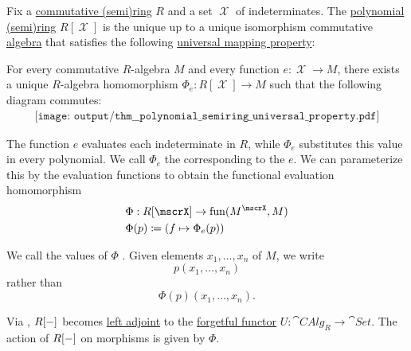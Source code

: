\begin{proposition}\label{thm:polynomial_semiring_universal_property}
  Fix a \hyperref[def:semiring/commutative]{commutative (semi)ring} \( R \) and a set \( \mscrX \) of indeterminates. The \hyperref[def:polynomial_semiring]{polynomial (semi)ring} \( R[\mscrX] \) is the unique up to a unique isomorphism commutative \hyperref[def:algebra_over_semiring]{algebra} that satisfies the following \hyperref[rem:universal_mapping_property]{universal mapping property}:
  \begin{displayquote}
    For every commutative \( R \)-algebra \( M \) and every function \( e: \mscrX \to M \), there exists a unique \( R \)-algebra homomorphism \( \Phi_e: R[\mscrX] \to M \) such that the following diagram commutes:
    \begin{equation}\label{eq:thm:free_semimodule_universal_property/diagram}
      \begin{aligned}
        \texttt{[image: output/thm\_\_polynomial\_semiring\_universal\_property.pdf]}
      \end{aligned}
    \end{equation}
  \end{displayquote}

  The function \( e \) evaluates each indeterminate in \( R \), while \( \Phi_e \) substitutes this value in every polynomial. We call \( \Phi_e \) the  corresponding to the  \( e \). We can parameterize this by the evaluation functions to obtain the functional evaluation homomorphism
  \begin{equation*}
    \begin{aligned}
      &\Phi: R[\mscrX] \to \fun(M^\mscrX, M) \\
      &\Phi(p) \coloneqq (f \mapsto \Phi_e(p))
    \end{aligned}
  \end{equation*}

  We call the values of \( \Phi \) . Given elements \( x_1, \ldots, x_n \) of \( M \), we write
  \begin{equation*}
    p(x_1, \ldots, x_n)
  \end{equation*}
  rather than
  \begin{equation*}
    \Phi(p)(x_1, \ldots, x_n).
  \end{equation*}

  Via , \( R[\anon*] \) becomes \hyperref[def:category_adjunction]{left adjoint} to the \hyperref[def:concrete_category]{forgetful functor} \( U: \cat{CAlg}_R \to \cat{Set} \). The action of \( R[\anon*] \) on morphisms is given by \( \Phi \).
\end{proposition}
